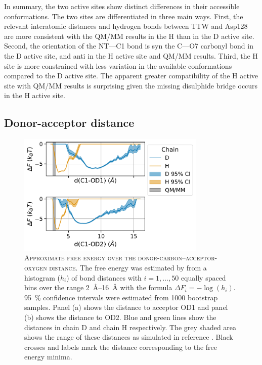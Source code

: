 In summary, the two active sites show distinct differences in their accessible conformations.  The two sites are differentiated in three main ways. First, the relevant interatomic distances and hydrogen bonds between TTW and Asp128 are more consistent with the QM/MM results in the H than in the D active site. Second, the orientation of the NT---C1 bond is syn the C---O7 carbonyl bond in the D active site, and anti in the H active site and QM/MM results. Third, the H site is more constrained with less variation in the available conformations compared to the  D active site. The apparent greater compatibility of the H active site with QM/MM results is surprising given the missing disulphide bridge occurs in the H active site.

\subsection{Donor-acceptor distance}

\begin{figure}
    \centering
    \includegraphics[width=0.8\textwidth]{chapters/aadh/figures/dad_free_energy.pdf}
    \caption[Approximate free energy over the donor-carbon--acceptor-oxygen distance]{\textsc{Approximate free energy over the donor-carbon--acceptor-oxygen distance}. The free energy was estimated by from a histogram ($h_{i}$) of bond distances with $i = 1, \ldots, 50$ equally spaced bins over the range \SIrange{2}{16}{\angstrom} with the formula $\Delta F_{i} = -\log{(h_{i})}$. \SI{95}{\percent} confidence intervals were estimated from \num{1000} bootstrap samples. Panel (a) shows the distance to acceptor OD1 and panel (b) shows the distance to OD2. Blue and green lines show the distances in chain D and chain H respectively. The grey shaded area shows the range of these distances as simulated in reference \cite{ranaghanInitioQMMM2017}. Black crosses and labels mark the distance corresponding to the free energy minima.}
    \label{fig:dad_free_energy}
\end{figure}


